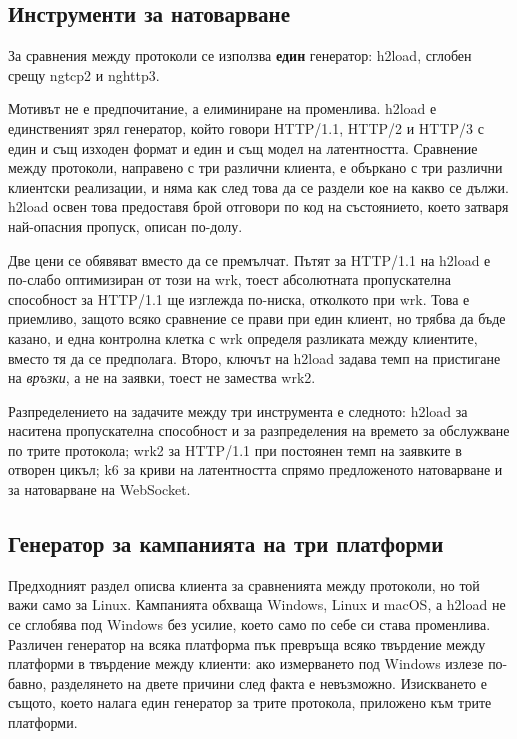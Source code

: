\subsection{Инструменти за натоварване}

За сравнения между протоколи се използва \textbf{един} генератор: h2load, сглобен срещу
ngtcp2 и nghttp3.

Мотивът не е предпочитание, а елиминиране на променлива. h2load е единственият зрял
генератор, който говори HTTP/1.1, HTTP/2 и HTTP/3 с един и същ изходен формат и един и същ
модел на латентността. Сравнение между протоколи, направено с три различни клиента, е
объркано с три различни клиентски реализации, и няма как след това да се раздели кое на
какво се дължи. h2load освен това предоставя брой отговори по код на състоянието, което
затваря най-опасния пропуск, описан по-долу.

Две цени се обявяват вместо да се премълчат. Пътят за HTTP/1.1 на h2load е по-слабо
оптимизиран от този на wrk, тоест абсолютната пропускателна способност за HTTP/1.1 ще
изглежда по-ниска, отколкото при wrk. Това е приемливо, защото всяко сравнение се прави при
един клиент, но трябва да бъде казано, и една контролна клетка с wrk определя разликата
между клиентите, вместо тя да се предполага. Второ, ключът  на h2load задава темп
на пристигане на \emph{връзки}, а не на заявки, тоест не замества wrk2.

Разпределението на задачите между три инструмента е следното: h2load за наситена
пропускателна способност и за разпределения на времето за обслужване по трите протокола;
wrk2 за HTTP/1.1 при постоянен темп на заявките в отворен цикъл; k6 за криви на латентността
спрямо предложеното натоварване и за натоварване на WebSocket.

\subsection{Генератор за кампанията на три платформи}

Предходният раздел описва клиента за сравненията между протоколи, но той важи само за Linux.
Кампанията обхваща Windows, Linux и macOS, а h2load не се сглобява под Windows без усилие,
което само по себе си става променлива. Различен генератор на всяка платформа пък превръща
всяко твърдение между платформи в твърдение между клиенти: ако измерването под Windows излезе
по-бавно, разделянето на двете причини след факта е невъзможно. Изискването е същото, което
налага един генератор за трите протокола, приложено към трите платформи.

